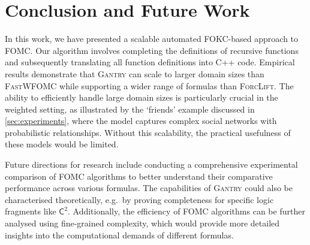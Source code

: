 \documentclass[a4paper,UKenglish,cleveref, autoref, thm-restate]{lipics-v2021}
\newcommand{\Ctwo}{$\mathsf{C}^{2}$}
\newcommand{\Cranetwo}{\textsc{Gantry}}
\begin{document}
\section{Conclusion and Future Work}\label{sec:conclusion}

In this work, we have presented a scalable automated FOKC-based approach to
FOMC. Our algorithm involves completing the definitions of recursive functions
and subsequently translating all function definitions into C++ code. Empirical
results demonstrate that \Cranetwo{} can scale to larger domain sizes than
\textsc{FastWFOMC} while supporting a wider range of formulas than
\textsc{ForcLift}. The ability to efficiently handle large domain sizes is
particularly crucial in the weighted setting, as illustrated by the `friends'
example discussed in \cref{sec:experiments}, where the model captures complex
social networks with probabilistic relationships. Without this scalability, the
practical usefulness of these models would be limited.

Future directions for research include conducting a comprehensive experimental
comparison of FOMC algorithms to better understand their comparative performance
across various formulas. The capabilities of \Cranetwo{} could also be
characterised theoretically, e.g.\ by proving completeness for specific logic
fragments like \Ctwo{}. Additionally, the efficiency of FOMC algorithms can be
further analysed using fine-grained complexity, which would provide more
detailed insights into the computational demands of different formulas.


\end{document}
